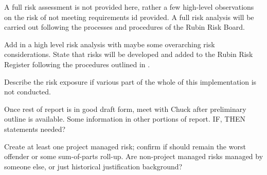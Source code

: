 A full risk assessment is not provided here, rather a few high-level observations on the risk of not meeting requirements id provided. A full risk analysis will be carried out following the processes and procedures of the Rubin Risk Board.


Add in a high level risk analysis with maybe some overarching risk considerations. 
State that risks will be developed and added to the Rubin Risk Register following  the procedures outlined in .

Describe the risk exposure if various part of the whole of this implementation is not conducted.

Once rest of report is in good draft form, meet with Chuck after preliminary outline is available.
Some information in other portions of report.
IF, THEN statements needed?

Create at least one project managed risk; confirm if should remain the worst offender or some sum-of-parts roll-up.
Are non-project managed risks managed by someone else, or just historical justification background?

